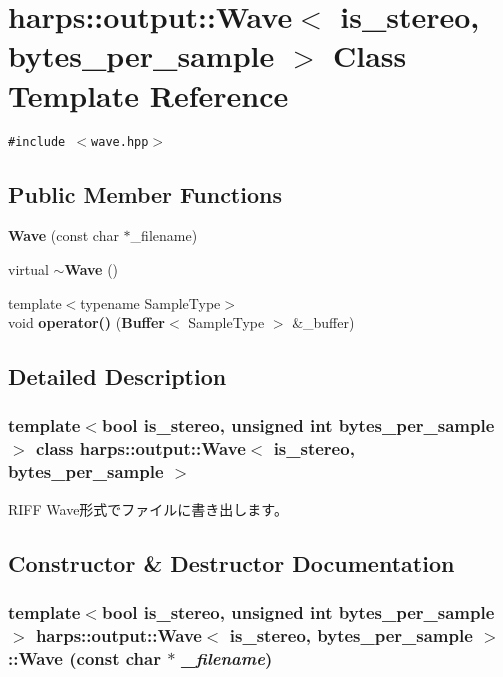 \section{harps::output::Wave$<$ is\_\-stereo, bytes\_\-per\_\-sample $>$ Class Template Reference}
\label{classharps_1_1output_1_1Wave}
{\tt \#include $<$wave.hpp$>$}

\subsection*{Public Member Functions}
\begin{CompactItemize}
\item 
{\bf Wave} (const char $\ast$\_\-filename)
\item 
virtual {\bf $\sim$Wave} ()
\item 
{\footnotesize template$<$typename SampleType$>$ }\\void {\bf operator()} ({\bf Buffer}$<$ SampleType $>$ \&\_\-buffer)
\end{CompactItemize}


\subsection{Detailed Description}
\subsubsection*{template$<$bool is\_\-stereo, unsigned int bytes\_\-per\_\-sample$>$ class harps::output::Wave$<$ is\_\-stereo, bytes\_\-per\_\-sample $>$}

RIFF Wave形式でファイルに書き出します。 

\subsection{Constructor \& Destructor Documentation}
\subsubsection[Wave]{\setlength{\rightskip}{0pt plus 5cm}template$<$bool is\_\-stereo, unsigned int bytes\_\-per\_\-sample$>$ {\bf harps::output::Wave}$<$ is\_\-stereo, bytes\_\-per\_\-sample $>$::{\bf Wave} (const char $\ast$ {\em \_\-filename})\hspace{0.3cm}{\tt  [inline]}}\label{classharps_1_1output_1_1Wave_220425fb4828faccdc2c6f3be63f498c}


